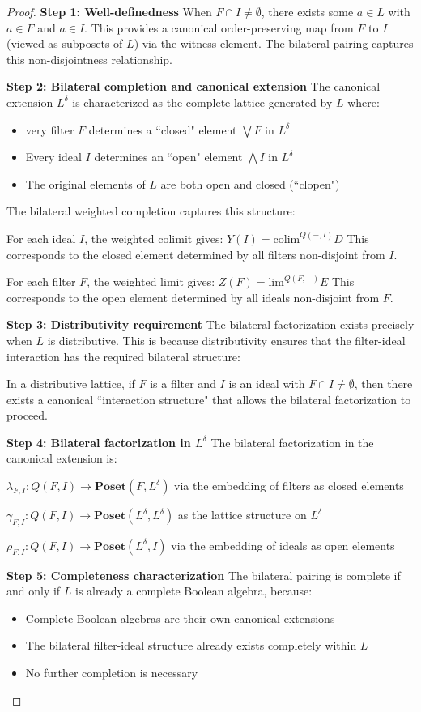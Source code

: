 \documentclass[11pt]{article}
\theoremstyle{plain}
\theoremstyle{definition}
\theoremstyle{remark}
\newcommand{\colim}{\mathrm{colim}}
\renewcommand{\lim}{\mathrm{lim}}
\begin{document}
\begin{proof}
\textbf{Step 1: Well-definedness}
When $F \cap I \neq \emptyset$, there exists some $a \in L$ with $a \in F$ and $a \in I$. This provides a canonical order-preserving map from $F$ to $I$ (viewed as subposets of $L$) via the witness element. The bilateral pairing captures this non-disjointness relationship.

\textbf{Step 2: Bilateral completion and canonical extension}
The canonical extension $L^{\delta}$ is characterized as the complete lattice generated by $L$ where:
\begin{itemize}
\item very filter $F$ determines a ``closed" element $\bigvee F$ in $L^{\delta}$
\item Every ideal $I$ determines an ``open" element $\bigwedge I$ in $L^{\delta}$
\item The original elements of $L$ are both open and closed (``clopen")
\end{itemize}

The bilateral weighted completion captures this structure:

For each ideal $I$, the weighted colimit gives:
$Y(I) = \colim^{Q(-, I)} D$
This corresponds to the closed element determined by all filters non-disjoint from $I$.

For each filter $F$, the weighted limit gives:
$Z(F) = \lim^{Q(F, -)} E$  
This corresponds to the open element determined by all ideals non-disjoint from $F$.

\textbf{Step 3: Distributivity requirement}
The bilateral factorization exists precisely when $L$ is distributive. This is because distributivity ensures that the filter-ideal interaction has the required bilateral structure:

In a distributive lattice, if $F$ is a filter and $I$ is an ideal with $F \cap I \neq \emptyset$, then there exists a canonical ``interaction structure" that allows the bilateral factorization to proceed.

\textbf{Step 4: Bilateral factorization in $L^{\delta}$}
The bilateral factorization in the canonical extension is:

$\lambda_{F,I} : Q(F, I) \to \mathbf{Poset}(F, L^{\delta})$ via the embedding of filters as closed elements

$\gamma_{F,I} : Q(F, I) \to \mathbf{Poset}(L^{\delta}, L^{\delta})$ as the lattice structure on $L^{\delta}$

$\rho_{F,I} : Q(F, I) \to \mathbf{Poset}(L^{\delta}, I)$ via the embedding of ideals as open elements

\textbf{Step 5: Completeness characterization}
The bilateral pairing is complete if and only if $L$ is already a complete Boolean algebra, because:
\begin{itemize}
\item Complete Boolean algebras are their own canonical extensions
\item The bilateral filter-ideal structure already exists completely within $L$
\item No further completion is necessary
\end{itemize}
\end{proof}
\end{document}

